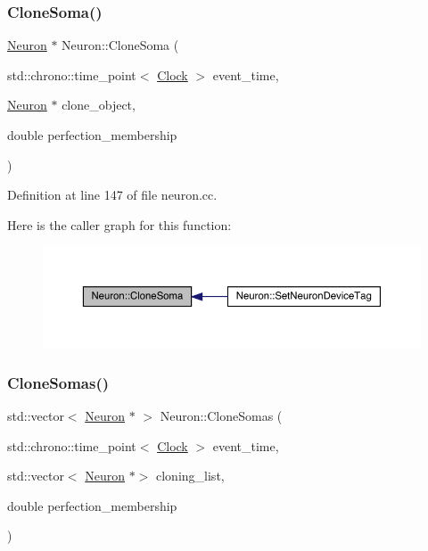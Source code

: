\subsubsection{\texorpdfstring{Clone\+Soma()}{CloneSoma()}}
{\footnotesize\ttfamily \hyperlink{class_neuron}{Neuron} $\ast$ Neuron\+::\+Clone\+Soma (\begin{DoxyParamCaption}\item[{std\+::chrono\+::time\+\_\+point$<$ \hyperlink{universe_8h_a0ef8d951d1ca5ab3cfaf7ab4c7a6fd80}{Clock} $>$}]{event\+\_\+time,  }\item[{\hyperlink{class_neuron}{Neuron} $\ast$}]{clone\+\_\+object,  }\item[{double}]{perfection\+\_\+membership }\end{DoxyParamCaption})}



Definition at line 147 of file neuron.\+cc.

Here is the caller graph for this function\+:
\nopagebreak
\begin{figure}[H]
\begin{center}
\leavevmode
\includegraphics[width=350pt]{class_neuron_a7706e0f722c70138458423c07b6b153b_icgraph}
\end{center}
\end{figure}
\mbox{\label{class_neuron_a508841fa635a6e89609c514a79ea59da}} 
\subsubsection{\texorpdfstring{Clone\+Somas()}{CloneSomas()}}
{\footnotesize\ttfamily std\+::vector$<$ \hyperlink{class_neuron}{Neuron} $\ast$ $>$ Neuron\+::\+Clone\+Somas (\begin{DoxyParamCaption}\item[{std\+::chrono\+::time\+\_\+point$<$ \hyperlink{universe_8h_a0ef8d951d1ca5ab3cfaf7ab4c7a6fd80}{Clock} $>$}]{event\+\_\+time,  }\item[{std\+::vector$<$ \hyperlink{class_neuron}{Neuron} $\ast$$>$}]{cloning\+\_\+list,  }\item[{double}]{perfection\+\_\+membership }\end{DoxyParamCaption})}



